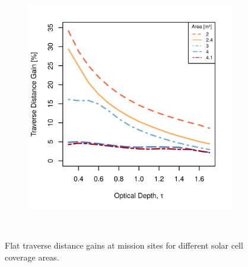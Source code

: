 \begin{figure}[h]
\begin{subfigure}[t]{\subfigureWidth}
        \includegraphics[height=\graphicsHeight]{sections/power-system-design/solar-array/plots/ismeniuscavus-75w-traverse-gains-for-different-solar-cell-coverage-areas.png}
		\label{fig:plot:sub:iani-chaos-flat-traverse-gains-for-different-sa-area}
	\end{subfigure}\\[0.8ex]
    \caption[Flat traverse distance gains at mission sites for different solar cell coverage areas]
            {Flat traverse distance gains at mission sites for different solar cell coverage areas.}
    \label{fig:plot:flat-traverse-gains-for-different-sa-area}
\vspace{-2ex}
\end{figure}


